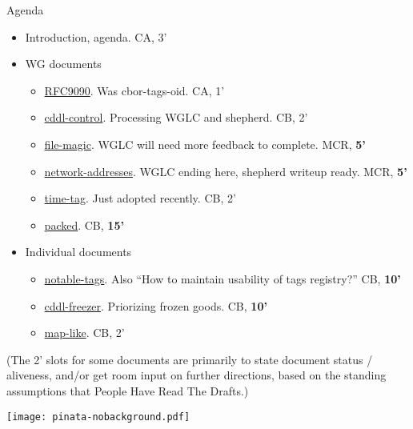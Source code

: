 \documentclass[aspectratio=169]{beamer}
\begin{document}
\begin{frame}{Agenda}\large
	\begin{itemize}
		\item Introduction, agenda. CA, 3’

		\item WG documents
			\begin{itemize}
				\item \href{https://datatracker.ietf.org/doc/rfc9090/}{RFC9090}. Was cbor-tags-oid. CA, 1’
				\item \href{https://datatracker.ietf.org/doc/draft-ietf-cbor-cddl-control/}{cddl-control}. Processing WGLC and shepherd. CB, 2’
				\item \href{https://datatracker.ietf.org/doc/draft-ietf-cbor-file-magic/}{file-magic}. WGLC will need more feedback to complete. MCR, \textbf{5’}
				\item \href{https://datatracker.ietf.org/doc/draft-ietf-cbor-network-addresses/}{network-addresses}. WGLC ending here, shepherd writeup ready. MCR, \textbf{5’}
				\item \href{https://datatracker.ietf.org/doc/draft-ietf-cbor-time-tag/}{time-tag}. Just adopted recently. CB, 2’
				\item \href{https://datatracker.ietf.org/doc/draft-ietf-cbor-packed/}{packed}. CB, \textbf{15’}
			\end{itemize}

			\item Individual documents
			\begin{itemize}
				\item \href{https://datatracker.ietf.org/doc/draft-bormann-cbor-notable-tags/}{notable-tags}. Also ``How to maintain usability of tags registry?'' CB, \textbf{10’}
				\item \href{https://datatracker.ietf.org/doc/draft-bormann-cbor-cddl-freezer/}{cddl-freezer}. Priorizing frozen goods. CB, \textbf{10’}
				\item \href{https://datatracker.ietf.org/doc/draft-bormann-cbor-cddl-map-like-data/}{map-like}. CB, 2’
			\end{itemize}
	\end{itemize}

	\small (The 2’ slots for some documents are primarily to state document status / aliveness, and/or get room input on further directions, based on the standing assumptions that People Have Read The Drafts.)

	\vspace{-3cm}
	\begin{block}{\texttt{[image: pinata-nobackground.pdf]}\mbox{\quad}}
	\end{block}
\end{frame}
\end{document}
